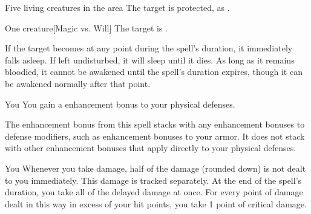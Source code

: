 \spelldur{\durshort}
\begin{spelltarget}{Five living creatures in the area}
    \spelleffect The target is protected, as .
\end{spelltarget}

\spellrng{\rngmed}
\spelldur{\durlong}
\begin{spelltarget}{One creature}[Magic vs. Will]
    \spellsuccess The target is \bewildered.

    If the target becomes \bloodied at any point during the spell's duration, it immediately falls asleep. If left undisturbed, it will sleep until it dies. As long as it remains bloodied, it cannot be awakened until the spell's duration expires, though it can be awakened normally after that point.
\end{spelltarget}

\spelldur{\durlong}
\begin{spelltarget}{You}
    \spelleffect You gain a  enhancement bonus to your physical defenses. \spellbonusscalingdescription
\end{spelltarget}
\spellnotes The enhancement bonus from this spell stacks with any enhancement bonuses to defense modifiers, such as enhancement bonuses to your armor. It does not stack with other enhancement bonuses that apply directly to your physical defenses. 

\spelldur{\durmed}
\begin{spelltarget}{You}
    \spelleffect Whenever you take damage, half of the damage (rounded down) is not dealt to you immediately. This damage is tracked separately. At the end of the spell's duration, you take all of the delayed damage at once. For every point of damage dealt in this way in excess of your hit points, you take 1 point of critical damage.
\end{spelltarget}

